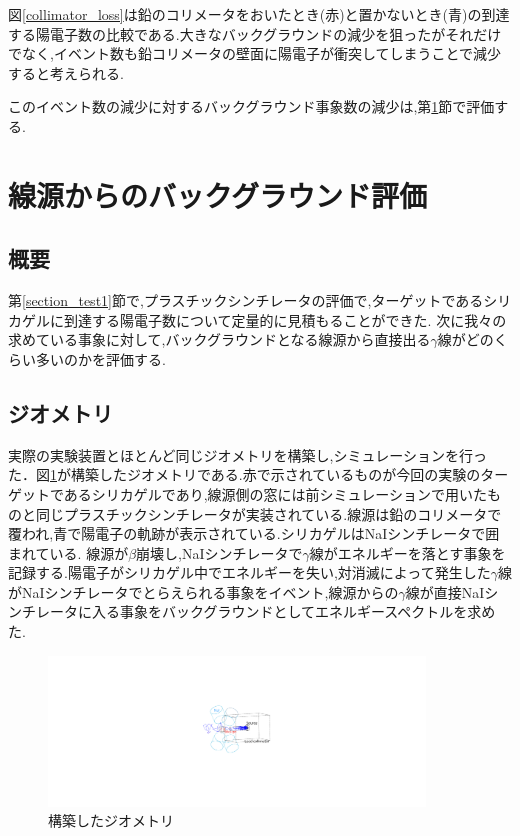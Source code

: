 図\ref{collimator_loss}は鉛のコリメータをおいたとき(赤)と置かないとき(青)の到達する陽電子数の比較である.大きなバックグラウンドの減少を狙ったがそれだけでなく,イベント数も鉛コリメータの壁面に陽電子が衝突してしまうことで減少すると考えられる.

このイベント数の減少に対するバックグラウンド事象数の減少は,第\ref{section_test2}節で評価する.

\section{線源からのバックグラウンド評価}
\label{section_test2}

\subsection{概要}
第\ref{section_test1}節で,プラスチックシンチレータの評価で,ターゲットであるシリカゲルに到達する陽電子数について定量的に見積もることができた.
次に我々の求めている事象に対して,バックグラウンドとなる線源から直接出る$\gamma$線がどのくらい多いのかを評価する.


\subsection{ジオメトリ}
実際の実験装置とほとんど同じジオメトリを構築し,シミュレーションを行った．図\ref{test2_geometry}が構築したジオメトリである.赤で示されているものが今回の実験のターゲットであるシリカゲルであり,線源側の窓には前シミュレーションで用いたものと同じプラスチックシンチレータが実装されている.線源は鉛のコリメータで覆われ,青で陽電子の軌跡が表示されている.シリカゲルはNaIシンチレータで囲まれている.
線源が$\beta$崩壊し,NaIシンチレータで$\gamma$線がエネルギーを落とす事象を記録する.陽電子がシリカゲル中でエネルギーを失い,対消滅によって発生した$\gamma$線がNaIシンチレータでとらえられる事象をイベント,線源からの$\gamma$線が直接NaIシンチレータに入る事象をバックグラウンドとしてエネルギースペクトルを求めた.

\begin{figure}[htbp]
	\centering
		\includegraphics[width=10cm]{img/test2_geometry.pdf}
	\caption{構築したジオメトリ}
	\label{test2_geometry}
\end{figure}

